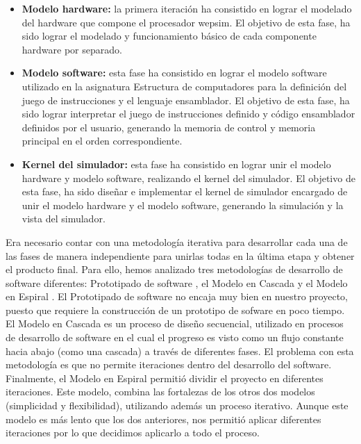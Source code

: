 \begin{itemize}
\item \textbf{Modelo \gls{hardware}:} la primera iteración ha consistido en lograr el modelado del \gls{hardware} que compone el procesador \acrshort{wepsim}. El objetivo de esta fase, ha sido lograr el modelado y funcionamiento básico de cada componente \gls{hardware} por separado.

\item \textbf{Modelo \gls{software}:} esta fase ha consistido en lograr el modelo \gls{software} utilizado en la asignatura Estructura de computadores para la definición del juego de instrucciones y el lenguaje \gls{ensamblador}. El objetivo de esta fase, ha sido lograr interpretar el juego de instrucciones definido y código \gls{ensamblador} definidos por el usuario, generando la memoria de control y memoria principal en el orden correspondiente.

\item \textbf{Kernel del simulador:} esta fase ha consistido en lograr unir el modelo \gls{hardware} y modelo \gls{software}, realizando el kernel del simulador. El objetivo de esta fase, ha sido diseñar e implementar el kernel de simulador encargado de unir el modelo \gls{hardware} y el modelo \gls{software}, generando la simulación y la vista del simulador.
\end{itemize}

Era necesario contar con una metodología iterativa para desarrollar cada una de las fases de manera independiente para unirlas todas en la última etapa y obtener el producto final. Para ello, hemos analizado tres metodologías de desarrollo de \gls{software} diferentes: Prototipado de \gls{software} \cite{grimm1998}, el Modelo en Cascada \cite{hebert1983} y el Modelo en Espiral \cite{boehm1988}. El  Prototipado de \Gls{software} no encaja muy bien en nuestro proyecto, puesto que requiere la construcción de un prototipo de sofware en poco tiempo. El Modelo en Cascada es un proceso de diseño secuencial, utilizado en procesos de desarrollo de \gls{software} en el cual el progreso es visto como un flujo constante hacia abajo (como una cascada) a través de diferentes fases. El problema con esta metodología es que no permite iteraciones dentro del desarrollo del \gls{software}. Finalmente, el Modelo en Espiral permitió dividir el proyecto en diferentes iteraciones. Este modelo, combina las fortalezas de los otros dos modelos (simplicidad y flexibilidad), utilizando además un proceso iterativo. Aunque este modelo es más lento que los dos anteriores, nos permitió aplicar diferentes iteraciones por lo que decidimos aplicarlo a todo el proceso.

